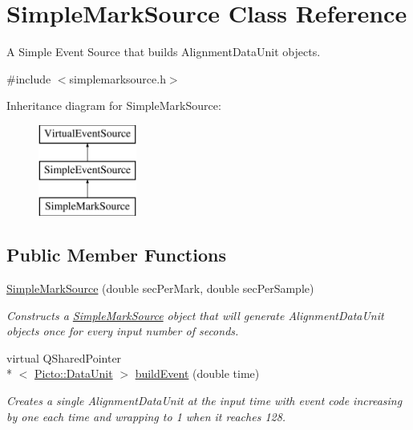 \hypertarget{class_simple_mark_source}{\section{Simple\-Mark\-Source Class Reference}
\label{class_simple_mark_source}
}


A Simple Event Source that builds Alignment\-Data\-Unit objects.  




{\ttfamily \#include $<$simplemarksource.\-h$>$}

Inheritance diagram for Simple\-Mark\-Source\-:\begin{figure}[H]
\begin{center}
\leavevmode
\includegraphics[height=3.000000cm]{class_simple_mark_source}
\end{center}
\end{figure}
\subsection*{Public Member Functions}
\begin{DoxyCompactItemize}
\item 
\hyperlink{class_simple_mark_source_adab8a96b8a8937d40d4dd360f7436213}{Simple\-Mark\-Source} (double sec\-Per\-Mark, double sec\-Per\-Sample)
\begin{DoxyCompactList}\small\item\em Constructs a \hyperlink{class_simple_mark_source}{Simple\-Mark\-Source} object that will generate Alignment\-Data\-Unit objects once for every input number of seconds. \end{DoxyCompactList}\item 
\hypertarget{class_simple_mark_source_a233577f961e2911124ae959809698b2a}{virtual Q\-Shared\-Pointer\\*
$<$ \hyperlink{class_picto_1_1_data_unit}{Picto\-::\-Data\-Unit} $>$ \hyperlink{class_simple_mark_source_a233577f961e2911124ae959809698b2a}{build\-Event} (double time)}\label{class_simple_mark_source_a233577f961e2911124ae959809698b2a}

\begin{DoxyCompactList}\small\item\em Creates a single Alignment\-Data\-Unit at the input time with event code increasing by one each time and wrapping to 1 when it reaches 128. \end{DoxyCompactList}\end{DoxyCompactItemize}
